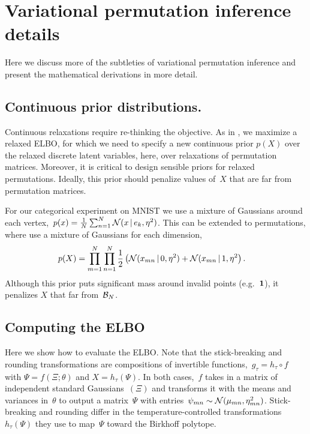 \section{Variational permutation inference details}

Here we discuss more of the subtleties of variational permutation
inference and present the mathematical derivations in more detail. 

\subsection{Continuous prior distributions.} 
Continuous relaxations require re-thinking the objective. As in
\cite{maddison2016concrete}, we maximize a relaxed ELBO, for which we
need to specify a new continuous prior $p(X)$ over the relaxed
discrete latent variables, here, over relaxations of permutation
matrices. Moreover, it is critical to design sensible priors for
relaxed permutations.  Ideally, this prior should penalize values
of~$X$ that are far from permutation matrices.

For our categorical experiment on MNIST we use a mixture of Gaussians
around each
vertex,~${p(x) = \tfrac{1}{N} \sum_{n=1}^N \mathcal{N}(x \, | \, e_k,
  \eta^2)}$.  This can be extended to permutations, where use a
mixture of Gaussians for each dimension,
\begin{align}
\label{eq:permprior}
  p(X) &= \prod_{m=1}^N \prod_{n=1}^N
  \frac{1}{2} \left(\mathcal{N}(x_{mn} \, | \, 0, \eta^2) + \mathcal{N}(x_{mn} \, | \, 1, \eta^2 \right).
\end{align}
Although this prior puts significant mass around invalid points
(e.g.~$\boldsymbol{1}$), it penalizes $X$ that far from~$\mathcal{B}_N$.

\subsection{Computing the ELBO}
Here we show how to evaluate the ELBO.  Note that the stick-breaking
and rounding transformations are compositions of invertible
functions,~${g_\tau = h_\tau \circ f}$ with ${\Psi = f(\Xi; \theta)}$ and
${X = h_\tau(\Psi)}$.  In both cases,~$f$ takes in a matrix of
independent standard Gaussians~$(\Xi)$ and transforms it with the
means and variances in~$\theta$ to output a matrix~$\Psi$ with
entries~${\psi_{mn} \sim \mathcal{N}(\mu_{mn}, \eta^2_{mn})}$.
Stick-breaking and rounding differ in the temperature-controlled
transformations~$h_\tau(\Psi)$ they use to map~$\Psi$ toward the
Birkhoff polytope.

